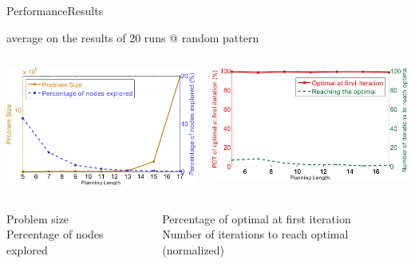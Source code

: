 \begin{frame}{Performance}{Results}

\begin{center}
average on the results of 20 runs @ random pattern
\end{center}

\begin{columns}
\begin{minipage}{\textwidth}
\includegraphics[width=\textwidth]{./figure/T_ProbSize_ExpRatio}
\end{minipage}
\begin{minipage}{\textwidth}
\includegraphics[width=\textwidth]{./figure/T_InitOpt_OptRch}
\end{minipage}
\end{columns}

\begin{columns}
\begin{center}
{\small 
\textcolor{metric-PR}{Problem size} \\
\textcolor{metric-NE}{Percentage of nodes explored}
}
\end{center}
\begin{center}
{\small 
\textcolor{metric-OFI}{Percentage of optimal at first iteration} \\
\textcolor{metric-IRO}{Number of iterations to reach optimal (normalized)}
}
\end{center}
\end{columns}

\end{frame}

